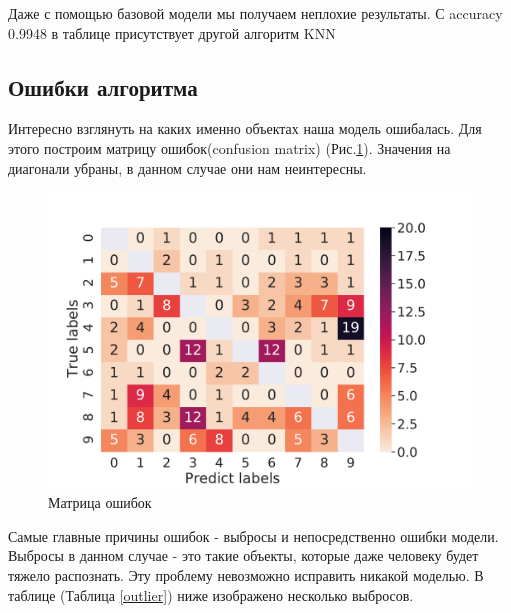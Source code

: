 \documentclass[12pt,fleqn]{article}
\begin{document}
Даже с помощью базовой модели мы получаем неплохие результаты. С accuracy 0.9948 в таблице присутствует другой
алгоритм KNN \cite{deformationmodels}


\subsection{Ошибки алгоритма}

Интересно взглянуть на каких именно объектах наша модель ошибалась. Для этого построим 
матрицу ошибок(confusion matrix) (Рис.\ref{pic3}). Значения на диагонали убраны, в данном случае они нам неинтересны.

\begin{figure}[htb]
    \centering
    \includegraphics[width=12cm]{task4.pdf}
    \caption{Матрица ошибок}
    \label{pic3}
\end{figure}

Самые главные причины ошибок - выбросы и непосредственно ошибки модели. Выбросы в данном случае - это такие объекты, 
которые даже человеку будет тяжело распознать. Эту проблему невозможно исправить никакой моделью. В таблице (Таблица \ref{outlier}) ниже
изображено несколько выбросов.
\end{document}
